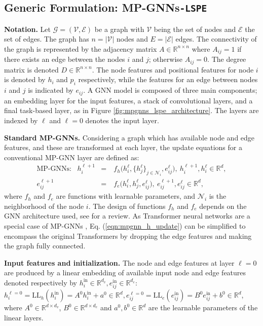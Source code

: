 \documentclass{article} \usepackage{iclr2021_conference,times}
\begin{document}
\subsection{Generic Formulation: MP-GNNs\texttt{-LSPE}}
\label{sec:generic_formulation}

{\bf Notation.} Let $\mathcal{G}= (\mathcal{V}, \mathcal{E})$ be a graph with $\mathcal{V}$ being the set of nodes and $\mathcal{E}$ the set of edges. The graph has $n=|\mathcal{V}|$ nodes and $E=|\mathcal{E}|$ edges. The connectivity of the graph is represented by the adjacency matrix $A \in \mathbb{R}^{n \times n}$ where $A_{ij} = 1$ if there exists an edge between the nodes $i$ and $j$; otherwise $A_{ij} = 0$. The degree matrix is denoted $D\in \mathbb{R}^{n \times n}$. The node features and positional features for node $i$ is denoted by $h_i$ and $p_i$ respectively, while the features for an edge between nodes $i$ and $j$ is indicated by $e_{ij}$. A GNN model is composed of three main components; an embedding layer for the input features, a stack of convolutional layers, and a final task-based layer, as in Figure \ref{fig:mpgnns_lspe_architecture}.
The layers are indexed by $\ell$ and $\ell=0$ denotes the input layer.


{\bf Standard MP-GNNs.} Considering a graph which has available node and edge features, and
these are transformed at each layer, the update equations for a conventional MP-GNN layer are defined as:
\begin{eqnarray}
\text{MP-GNNs}: \ \ \  h_i^{\ell+1} &=& \ f_{h} \Big( h_i^{\ell}, \big\{h_j^{\ell}\big\}_{j \in \mathcal{N}_i}, e_{ij}^{\ell} \Big), \ h_i^{\ell+1},h_i^{\ell}\in\mathbb{R}^{d}, \label{eqn:mpgnn_h_update}\\
    e_{ij}^{\ell+1} &=& \ f_{e} \Big( h_i^{\ell}, h_j^{\ell}, e_{ij}^{\ell}\Big), \ e_{ij}^{\ell+1},e_{ij}^{\ell}\in\mathbb{R}^{d}, \label{eqn:mpgnn_e_update}
\end{eqnarray}
where $f_h$ and $f_e$ are functions with learnable parameters, and $\mathcal{N}_i$ is the neighborhood of the node $i$. The design of functions $f_h$ and $f_e$ depends on the GNN architecture used, see \cite{zhou2020graph} for a review.
As Transformer neural networks \citep{vaswani2017attention} are a special case of MP-GNNs \citep{joshi2020transformers}, Eq. (\ref{eqn:mpgnn_h_update}) can be simplified to encompass the original Transformers by dropping the edge features and making the graph fully connected.


{\bf Input features and initialization.} The node and edge features at layer $\ell=0$ are produced by a linear embedding of available input node and edge features denoted respectively by $h_i^\textrm{in} \in \mathbb{R}^{d_v}, e_{ij}^\textrm{in} \in \mathbb{R}^{d_e}$: $h_i^{\ell=0} = \textrm{LL}_h (h_i^\textrm{in}) = A^0 h_i^\textrm{in} + a^0 \in\mathbb{R}^{d}, e_{ij}^{\ell=0} = \textrm{LL}_e (e_{ij}^\textrm{in}) = B^0 e_{ij}^\textrm{in} + b^0 \in\mathbb{R}^{d}$, 
where $A^0 \in \mathbb{R}^{d \times d_v}$, $B^0 \in \mathbb{R}^{d \times d_e}$ and $a^0,b^0 \in \mathbb{R}^d$ are the learnable parameters of the linear layers.
\end{document}
